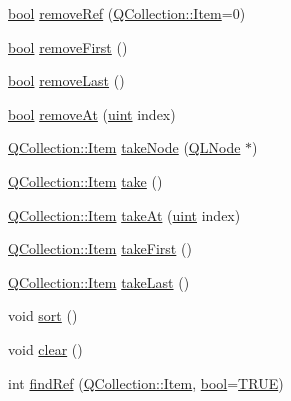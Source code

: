 \begin{DoxyCompactItemize}
\item 
\hyperlink{qglobal_8h_a1062901a7428fdd9c7f180f5e01ea056}{bool} \hyperlink{class_q_g_list_aa14205a4214d12b86c133255c094affd}{remove\+Ref} (\hyperlink{class_q_collection_ac6f3ddbf999e31fb797927f71ae6b5d7}{Q\+Collection\+::\+Item}=0)
\item 
\hyperlink{qglobal_8h_a1062901a7428fdd9c7f180f5e01ea056}{bool} \hyperlink{class_q_g_list_a8fac66ae43bc16f0721d9a3ec63a3cf5}{remove\+First} ()
\item 
\hyperlink{qglobal_8h_a1062901a7428fdd9c7f180f5e01ea056}{bool} \hyperlink{class_q_g_list_ae92ecdd681011d8ab6f4e8517b5e24b9}{remove\+Last} ()
\item 
\hyperlink{qglobal_8h_a1062901a7428fdd9c7f180f5e01ea056}{bool} \hyperlink{class_q_g_list_a2d91e82edec9c97315c3b3b237fbb492}{remove\+At} (\hyperlink{qglobal_8h_a4d3943ddea65db7163a58e6c7e8df95a}{uint} index)
\item 
\hyperlink{class_q_collection_ac6f3ddbf999e31fb797927f71ae6b5d7}{Q\+Collection\+::\+Item} \hyperlink{class_q_g_list_a256c045c464961c22f30259083c80a3c}{take\+Node} (\hyperlink{class_q_l_node}{Q\+L\+Node} $\ast$)
\item 
\hyperlink{class_q_collection_ac6f3ddbf999e31fb797927f71ae6b5d7}{Q\+Collection\+::\+Item} \hyperlink{class_q_g_list_a4b926803feca834f03fefa6bf614dcb1}{take} ()
\item 
\hyperlink{class_q_collection_ac6f3ddbf999e31fb797927f71ae6b5d7}{Q\+Collection\+::\+Item} \hyperlink{class_q_g_list_a7bcc304d043e120dc97c09e0253da756}{take\+At} (\hyperlink{qglobal_8h_a4d3943ddea65db7163a58e6c7e8df95a}{uint} index)
\item 
\hyperlink{class_q_collection_ac6f3ddbf999e31fb797927f71ae6b5d7}{Q\+Collection\+::\+Item} \hyperlink{class_q_g_list_ab9dccfb30688be7b75f330bf78268c11}{take\+First} ()
\item 
\hyperlink{class_q_collection_ac6f3ddbf999e31fb797927f71ae6b5d7}{Q\+Collection\+::\+Item} \hyperlink{class_q_g_list_a7e31eb310e365d503d6286f5fb1b0b49}{take\+Last} ()
\item 
void \hyperlink{class_q_g_list_aafb785818e1ff9a3a72daacabd549b54}{sort} ()
\item 
void \hyperlink{class_q_g_list_a9b89540497bfcf674466dcf9e343d981}{clear} ()
\item 
int \hyperlink{class_q_g_list_a67bc1cdeeadadd5c0c6fd976c62892b8}{find\+Ref} (\hyperlink{class_q_collection_ac6f3ddbf999e31fb797927f71ae6b5d7}{Q\+Collection\+::\+Item}, \hyperlink{qglobal_8h_a1062901a7428fdd9c7f180f5e01ea056}{bool}=\hyperlink{qglobal_8h_a04a6422a52070f0dc478693da640242b}{T\+R\+U\+E})

\end{DoxyCompactItemize}

